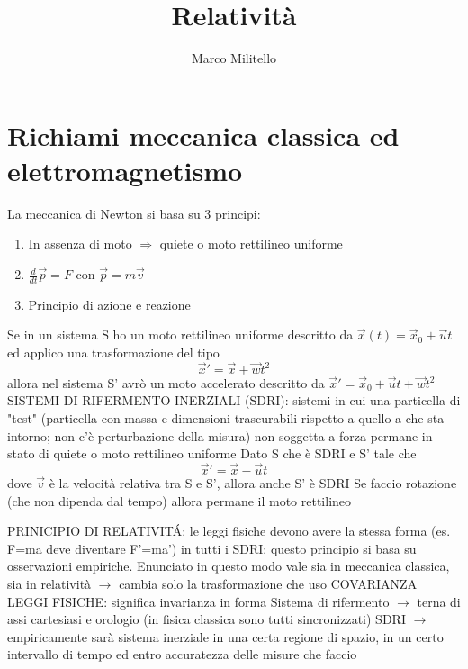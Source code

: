 \documentclass[a4paper,11pt]{report}
\theoremstyle{remark}
\theoremstyle{definition}
\begin{document}
	\date{}
	\author{Marco Militello}
	\title{Relatività}
	\maketitle
	\tableofcontents
	\newpage

\chapter{Richiami meccanica classica ed elettromagnetismo}

La meccanica di Newton si basa su 3 principi:
\begin{enumerate}
    \item In assenza di moto $\Rightarrow$ quiete o moto rettilineo uniforme
    \item $\frac{d}{dt}\vec{p} = F $ con $ \vec{p} = m\vec{v}$
    \item Principio di azione e reazione
\end{enumerate}
Se in un sistema S ho un moto rettilineo uniforme descritto da $\vec{x}(t) = \vec{x}_0 + \vec{u}t$ ed applico una trasformazione del tipo
\begin{equation*}
    \vec{x}' = \vec{x} + \vec{w}t^2
\end{equation*}
allora nel sistema S' avrò un moto accelerato descritto da $\vec{x}' = \vec{x}_0 + \vec{u}t + \vec{w}t^2$ \newline
SISTEMI DI RIFERMENTO INERZIALI (SDRI): sistemi in cui una particella di "test" (particella con massa e dimensioni trascurabili rispetto a quello a che sta intorno; non c'è perturbazione della misura) non soggetta a forza permane in stato di quiete o moto rettilineo uniforme \newline
Dato S che è SDRI e S' tale che 
\begin{equation*}
    \vec{x}' = \vec{x} - \vec{u}t
\end{equation*} 
dove $\vec{v}$ è la velocità relativa tra S e S', allora anche S' è SDRI \newline
Se faccio rotazione (che non dipenda dal tempo) allora permane il moto rettilineo \newline

\noindent PRINICIPIO DI RELATIVIT\'A: le leggi fisiche devono avere la stessa forma (es. F=ma deve diventare F'=ma') in tutti i SDRI; questo principio si basa su osservazioni empiriche. Enunciato in questo modo vale sia in meccanica classica, sia in relatività $\rightarrow$ cambia solo la trasformazione che uso \newline
COVARIANZA LEGGI FISICHE: significa invarianza in forma \newline
Sistema di rifermento $\rightarrow$ terna di assi cartesiasi e orologio (in fisica classica sono tutti sincronizzati) \newline
SDRI $ \rightarrow$ empiricamente sarà sistema inerziale in una certa regione di spazio, in un certo intervallo di tempo ed entro accuratezza delle misure che faccio
\end{document}
